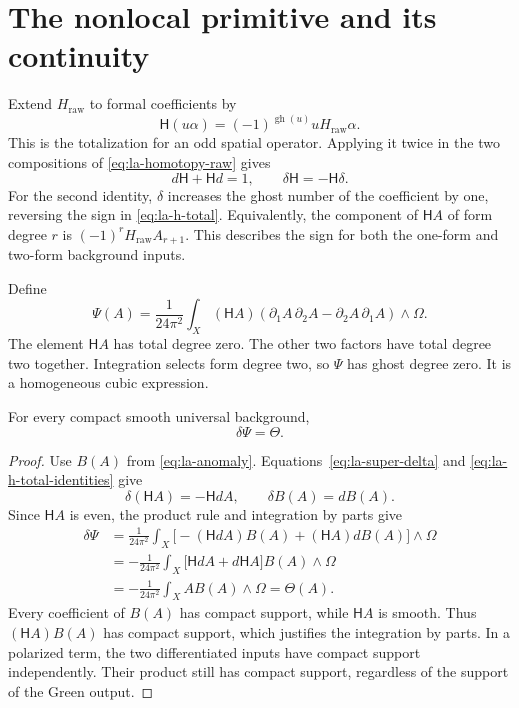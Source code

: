 \section{The nonlocal primitive and its continuity}
\label{sec:la-primitive}

Extend $H_{\mathrm{raw}}$ to formal coefficients by
\begin{equation}\label{eq:la-h-total}
 \mathsf H(u\alpha)
 =(-1)^{\operatorname{gh}(u)}uH_{\mathrm{raw}}\alpha.
\end{equation}
This is the totalization for an odd spatial operator.
Applying it twice in the two compositions of
\eqref{eq:la-homotopy-raw} gives
\begin{equation}\label{eq:la-h-total-identities}
 d\mathsf H+\mathsf Hd=1,
 \qquad \delta\mathsf H=-\mathsf H\delta.
\end{equation}
For the second identity, $\delta$ increases the ghost number
of the coefficient by one, reversing the sign in
\eqref{eq:la-h-total}. Equivalently, the component of
$\mathsf HA$ of form degree $r$ is
$(-1)^rH_{\mathrm{raw}}A_{r+1}$. This describes the sign for
both the one-form and two-form background inputs.

Define
\begin{equation}\label{eq:la-primitive}
 \boxed{\displaystyle
 \Psi(A)=\frac1{24\pi^2}
       \int_X(\mathsf HA)
        (\partial_1A\,\partial_2A
                  -\partial_2A\,\partial_1A)\wedge\Omega.}
\end{equation}
The element $\mathsf HA$ has total degree zero. The other
two factors have total degree two together. Integration
selects form degree two, so $\Psi$ has ghost degree zero.
It is a homogeneous cubic expression.

\begin{proposition}\label{prop:la-primitive-identity}
For every compact smooth universal background,
\begin{equation}\label{eq:la-primitive-identity}
 \delta\Psi=\Theta.
\end{equation}
\end{proposition}
\begin{proof}
Use $B(A)$ from \eqref{eq:la-anomaly}.
Equations~\eqref{eq:la-super-delta} and
\eqref{eq:la-h-total-identities} give
\[
 \delta(\mathsf HA)=-\mathsf HdA,
 \qquad \delta B(A)=dB(A).
\]
Since $\mathsf HA$ is even, the product rule and integration
by parts give
\begin{align*}
 \delta\Psi
 &=\frac1{24\pi^2}\int_X
       \bigl[-(\mathsf HdA)B(A)
                     +(\mathsf HA)dB(A)\bigr]\wedge\Omega\\
 &=-\frac1{24\pi^2}\int_X
       \bigl[\mathsf HdA+d\mathsf HA\bigr]B(A)\wedge\Omega\\
 &=-\frac1{24\pi^2}\int_X A B(A)\wedge\Omega
 =\Theta(A).
\end{align*}
Every coefficient of $B(A)$ has compact support, while
$\mathsf HA$ is smooth. Thus $(\mathsf HA)B(A)$ has compact
support, which justifies the integration by parts. In a
polarized term, the two differentiated inputs have compact
support independently. Their product still has compact
support, regardless of the support of the Green output.
\end{proof}

